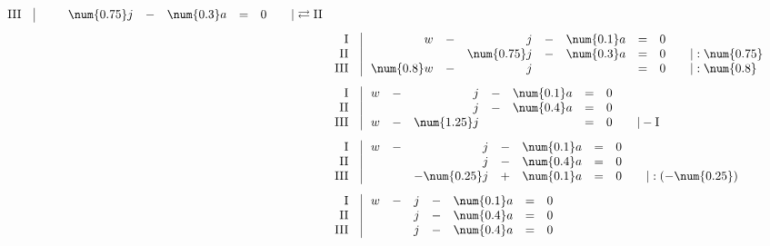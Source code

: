 \begin{exercise}
\begin{enumerate}[a)]
\begin{alignat*}{1}
\begin{array}{r|rcrcrcll}
                \text{III}\;\;&\;            &   & \num{0.75}j & - & \num{0.3}a & = & 0 & \quad|\rightleftarrows\text{II}
                \end{array}
                \\[1ex] &
                \begin{array}{r|rcrcrcll}
                  \text{I}\;\;&\;          w & - &           j & - & \num{0.1}a & = & 0 & \quad\relax       \\
                 \text{II}\;\;&\;            &   & \num{0.75}j & - & \num{0.3}a & = & 0 & \quad|:\num{0.75} \\
                \text{III}\;\;&\; \num{0.8}w & - &           j &   &            & = & 0 & \quad|:\num{0.8}
                \end{array}
                \\[1ex] &
                \begin{array}{r|rcrcrcll}
                  \text{I}\;\;&\; w & - &           j & - & \num{0.1}a & = & 0 & \quad\relax \\
                 \text{II}\;\;&\;   &   &           j & - & \num{0.4}a & = & 0 & \quad\relax \\
                \text{III}\;\;&\; w & - & \num{1.25}j &   &            & = & 0 & \quad|-\text{I}
                \end{array}
                \\[1ex] &
                \begin{array}{r|rcrcrcll}
                  \text{I}\;\;&\; w & - &            j & - & \num{0.1}a & = & 0 & \quad\relax \\
                 \text{II}\;\;&\;   &   &            j & - & \num{0.4}a & = & 0 & \quad\relax \\
                \text{III}\;\;&\;   &   & -\num{0.25}j & + & \num{0.1}a & = & 0 & \quad|:(-\num{0.25})
                \end{array}
                \\[1ex] &
                \begin{array}{r|rcrcrcll}
                  \text{I}\;\;&\; w & - & j & - & \num{0.1}a & = & 0 & \quad\relax \\
                 \text{II}\;\;&\;   &   & j & - & \num{0.4}a & = & 0 & \quad\relax \\
                \text{III}\;\;&\;   &   & j & - & \num{0.4}a & = & 0 & \quad\relax
                \end{array}
              \end{alignat*}

\end{enumerate}
\end{exercise}
